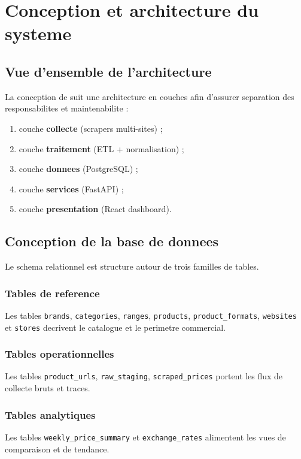 \chapter{Conception et architecture du systeme}

\section{Vue d'ensemble de l'architecture}
La conception de \ProjectName{} suit une architecture en couches afin d'assurer separation des responsabilites et maintenabilite :
\begin{enumerate}[leftmargin=1.2cm]
	\item couche \textbf{collecte} (scrapers multi-sites) ;
	\item couche \textbf{traitement} (ETL + normalisation) ;
	\item couche \textbf{donnees} (PostgreSQL) ;
	\item couche \textbf{services} (FastAPI) ;
	\item couche \textbf{presentation} (React dashboard).
\end{enumerate}


\section{Conception de la base de donnees}
Le schema relationnel est structure autour de trois familles de tables.

\subsection{Tables de reference}
Les tables \texttt{brands}, \texttt{categories}, \texttt{ranges}, \texttt{products}, \texttt{product\_formats}, \texttt{websites} et \texttt{stores} decrivent le catalogue et le perimetre commercial.

\subsection{Tables operationnelles}
Les tables \texttt{product\_urls}, \texttt{raw\_staging}, \texttt{scraped\_prices} portent les flux de collecte bruts et traces.

\subsection{Tables analytiques}
Les tables \texttt{weekly\_price\_summary} et \texttt{exchange\_rates} alimentent les vues de comparaison et de tendance.

